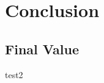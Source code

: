 \chapter{Conclusion}
\label{chapter:Conclusion}
\thispagestyle{myheadings} %

\section{Final Value}
\label{sec:FinalValue}

test2
